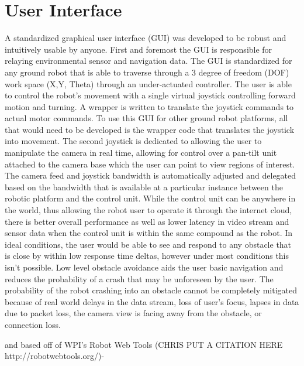 \section{User Interface}\label{sec:ui}

A standardized graphical user interface (GUI) was developed to be robust and intuitively usable by anyone. First and foremost the GUI is responsible for relaying environmental sensor and navigation data. The GUI is standardized for any ground robot that is able to traverse through a 3 degree of freedom (DOF) work space (X,Y, Theta) through an under-actuated controller. The user is able to control the robot's movement with a single virtual joystick controlling forward motion and turning. A wrapper is written to translate the joystick commands to actual motor commands. To use this GUI for other ground robot platforms, all that would need to be developed is the wrapper code that translates the joystick into movement. The second joystick is dedicated to allowing the user to manipulate the camera in real time, allowing for control over a pan-tilt unit attached to the camera base which the user can point to view regions of interest. The camera feed and joystick bandwidth is automatically adjusted and delegated based on the bandwidth that is available at a particular instance between the robotic platform and the control unit. While the control unit can be anywhere in the world, thus allowing the robot user to operate it through the internet cloud, there is better overall performance as well as lower latency in video stream and sensor data when the control unit is within the same compound as the robot. In ideal conditions, the user would be able to see and respond to any obstacle that is close by within low response time deltas, however under most conditions this isn't possible. Low level obstacle avoidance aids the user basic navigation and reduces the probability of a crash that may be unforeseen by the user. The probability of the robot crashing into an obstacle cannot be completely mitigated because of real world delays in the data stream, loss of user's focus, lapses in data due to packet loss, the camera view is facing away from the obstacle, or connection loss.

and based off of WPI's Robot Web Tools (CHRIS PUT A CITATION HERE http://robotwebtools.org/)-  

